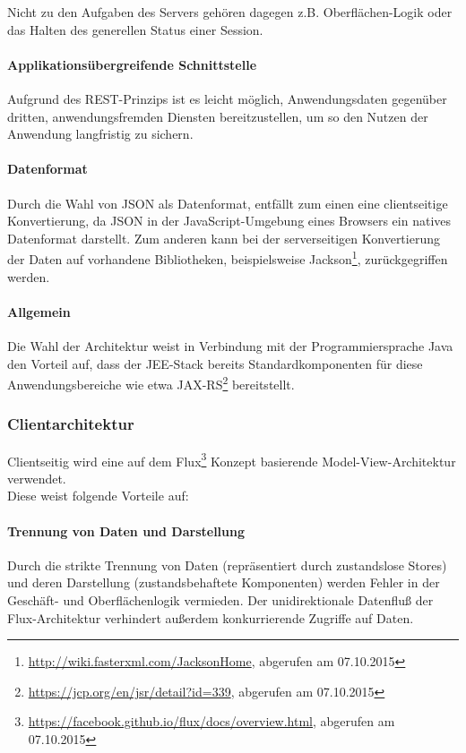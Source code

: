 \documentclass[12pt, xcolor=dvipsnames]{scrartcl}
\begin{document}
Nicht zu den Aufgaben des Servers gehören dagegen z.B. Oberflächen-Logik oder das Halten des generellen Status einer Session.

\paragraph{Applikationsübergreifende Schnittstelle}
Aufgrund des REST-Prinzips ist es leicht möglich, Anwendungsdaten gegenüber dritten, anwendungsfremden Diensten bereitzustellen, um so den Nutzen der Anwendung langfristig zu sichern.

\paragraph{Datenformat}
Durch die Wahl von JSON als Datenformat, entfällt zum einen eine clientseitige Konvertierung, da JSON in der JavaScript-Umgebung eines Browsers ein natives Datenformat darstellt. Zum anderen kann bei der serverseitigen Konvertierung der Daten auf vorhandene Bibliotheken, beispielsweise
Jackson\footnote{\url{http://wiki.fasterxml.com/JacksonHome}, abgerufen am 07.10.2015},
zurückgegriffen werden.

\paragraph{Allgemein}
Die Wahl der Architektur weist in Verbindung mit der Programmiersprache Java den Vorteil auf, dass der JEE-Stack bereits Standardkomponenten für diese Anwendungsbereiche wie etwa
JAX-RS\footnote{\url{https://jcp.org/en/jsr/detail?id=339}, abgerufen am 07.10.2015}
bereitstellt.


\subsubsection{Clientarchitektur}

Clientseitig wird eine auf dem
Flux\footnote{\url{https://facebook.github.io/flux/docs/overview.html}, abgerufen am 07.10.2015} Konzept basierende Model-View-Architektur verwendet. \\

Diese weist folgende Vorteile auf:

\paragraph{Trennung von Daten und Darstellung}
Durch die strikte Trennung von Daten (repräsentiert durch zustandslose Stores) und deren Darstellung (zustandsbehaftete Komponenten) werden Fehler in der Geschäft- und Oberflächenlogik vermieden. Der unidirektionale Datenfluß der Flux-Architektur verhindert außerdem konkurrierende Zugriffe auf Daten.
\end{document}
